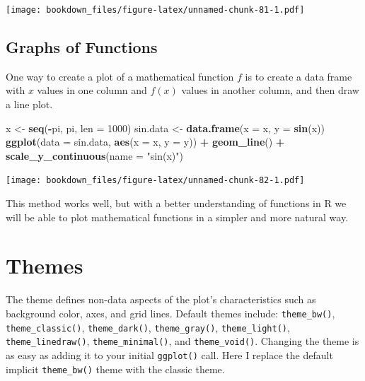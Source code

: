 \documentclass[
]{krantz}
\makeatletter
\newenvironment{Shaded}{\begin{snugshade}}{\end{snugshade}}
\newcommand{\DataTypeTok}[1]{\textcolor[rgb]{0.27,0.27,0.27}{#1}}
\newcommand{\DecValTok}[1]{\textcolor[rgb]{0.06,0.06,0.06}{#1}}
\newcommand{\KeywordTok}[1]{\textcolor[rgb]{0.27,0.27,0.27}{\textbf{#1}}}
\newcommand{\NormalTok}[1]{#1}
\newcommand{\OperatorTok}[1]{\textcolor[rgb]{0.43,0.43,0.43}{\textbf{#1}}}
\newcommand{\StringTok}[1]{\textcolor[rgb]{0.5,0.5,0.5}{#1}}
\newenvironment{kframe}{%
\medskip{}
\setlength{\fboxsep}{.8em}
 \def\at@end@of@kframe{}%
 \ifinner\ifhmode%
  \def\at@end@of@kframe{\end{minipage}}%
  \begin{minipage}{\columnwidth}%
 \fi\fi%
 \def\FrameCommand##1{\hskip\@totalleftmargin \hskip-\fboxsep
 \colorbox{shadecolor}{##1}\hskip-\fboxsep
     \hskip-\linewidth \hskip-\@totalleftmargin \hskip\columnwidth}%
 \MakeFramed {\advance\hsize-\width
   \@totalleftmargin\z@ \linewidth\hsize
   \@setminipage}}%
 {\par\unskip\endMakeFramed%
 \at@end@of@kframe}
\renewenvironment{Shaded}{\begin{kframe}}{\end{kframe}}
\makeatother
\begin{document}
\texttt{[image: bookdown\_files/figure-latex/unnamed-chunk-81-1.pdf]}

\hypertarget{graphs-of-functions}{%
\subsection{Graphs of Functions}\label{graphs-of-functions}}

One way to create a plot of a mathematical function \(f\) is to create a data frame with \(x\) values in one column and \(f(x)\) values in another column, and then draw a line plot.

\begin{Shaded}
\begin{Highlighting}[]
\NormalTok{x \textless{}{-}}\StringTok{ }\KeywordTok{seq}\NormalTok{(}\OperatorTok{{-}}\NormalTok{pi, pi, }\DataTypeTok{len =} \DecValTok{1000}\NormalTok{)}
\NormalTok{sin.data \textless{}{-}}\StringTok{ }\KeywordTok{data.frame}\NormalTok{(}\DataTypeTok{x =}\NormalTok{ x, }\DataTypeTok{y =} \KeywordTok{sin}\NormalTok{(x))}
\KeywordTok{ggplot}\NormalTok{(}\DataTypeTok{data =}\NormalTok{ sin.data, }\KeywordTok{aes}\NormalTok{(}\DataTypeTok{x =}\NormalTok{ x, }\DataTypeTok{y =}\NormalTok{ y)) }\OperatorTok{+}\StringTok{ }\KeywordTok{geom\_line}\NormalTok{() }\OperatorTok{+}\StringTok{ }
\StringTok{    }\KeywordTok{scale\_y\_continuous}\NormalTok{(}\DataTypeTok{name =} \StringTok{"sin(x)"}\NormalTok{)}
\end{Highlighting}
\end{Shaded}

\texttt{[image: bookdown\_files/figure-latex/unnamed-chunk-82-1.pdf]}

This method works well, but with a better understanding of functions in R we will be able to plot mathematical functions in a simpler and more natural way.

\hypertarget{themes}{%
\section{Themes}\label{themes}}

The theme defines non-data aspects of the plot's characteristics such as background color, axes, and grid lines. Default themes include: \texttt{theme\_bw()}, \texttt{theme\_classic()}, \texttt{theme\_dark()}, \texttt{theme\_gray()}, \texttt{theme\_light()}, \texttt{theme\_linedraw()}, \texttt{theme\_minimal()}, and \texttt{theme\_void()}. Changing the theme is as easy as adding it to your initial \texttt{ggplot()} call. Here I replace the default implicit \texttt{theme\_bw()} theme with the classic theme.
\end{document}
